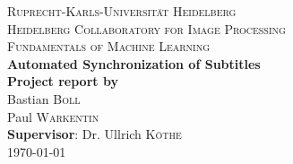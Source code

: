 \begin{titlepage}
    \center

    \textsc{\LARGE Ruprecht-Karls-Universität Heidelberg} \\[1cm]
    \textsc{\large Heidelberg Collaboratory for Image Processing} \\[2.5cm]
    \textsc{\Large Fundamentals of Machine Learning} \\[3cm]

    {\Huge \bfseries Automated Synchronization of Subtitles} \\[2cm]

    {\large \textbf{Project report by}} \\[0.1cm]
    Bastian \textsc{Boll} \\
    Paul \textsc{Warkentin} \\[0.5cm]

    \textbf{Supervisor}: Dr. Ullrich \textsc{Köthe} \\[2cm]

    {\large \today}

    \vspace{\fill}
\end{titlepage}

